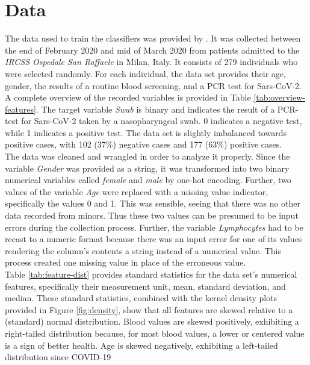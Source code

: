 \section{Data}
The data used to train the classifiers was provided by 
\citeauthor{RN127} \cite{RN127}. 
It was collected between the end of February 2020 and mid of March 2020 from 
patients admitted to the \textit{IRCSS Ospedale San Raffaele} in Milan, 
Italy. It consists of 279 individuals who were selected randomly.
For each individual, the data set provides their age, gender, the results of a 
routine blood screening, and a PCR test for Sars-CoV-2.
A complete overview of the recorded variables is provided in Table 
\ref{tab:overview-features}. The target variable \textit{Swab} is binary and 
indicates the result of a PCR-test for Sars-CoV-2 taken by a nasopharyngeal 
swab. 0 indicates a negative test, while 1 indicates a positive test.
The data set is slightly imbalanced towards positive cases, with 102 (37\%) 
negative cases and 177 (63\%) positive cases.
\\
The data was cleaned and wrangled in order to analyze it properly.
Since the variable \textit{Gender} 
was provided as a string, it was transformed into two binary numerical 
variables called \textit{female} and \textit{male} by one-hot encoding.
Further, two values of the variable \textit{Age} were replaced with a missing 
value indicator, specifically 
the values 0 and 1. This was sensible, seeing that there was no other 
data recorded from minors. Thus these two values can 
be presumed to be input errors during the collection process.
Further, the variable \textit{Lymphocytes} had to be recast to a numeric 
format because there was an input error for one of its 
values rendering the column's contents a string instead of a numerical 
value. This process created one missing value in place of the erroneous value.
\\
Table \ref{tab:feature-dist} provides standard statistics for the data set's 
numerical features, specifically their measurement unit, mean, standard 
deviation, and median.
These standard statistics, combined with the kernel density plots 
provided in Figure \ref{fig:density}, show that all features are skewed 
relative to a (standard) normal distribution. Blood values are 
skewed positively, exhibiting a right-tailed distribution because, for most 
blood values, a lower or centered value is a sign of better health. Age 
is skewed negatively, exhibiting a left-tailed distribution since COVID-19 
